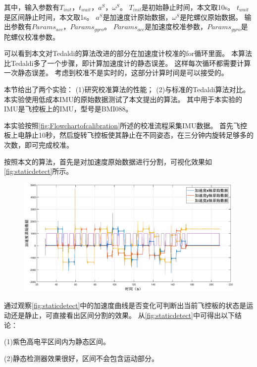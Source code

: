 \documentclass[
  type=master
]{gdutthesis}
\begin{document}
其中，输入参数有$T_{init}$，$t_{wait}$，$a^S$，$\omega^S$。
$T_{init}$是初始静止时间，本文取10s。
$t_{wait}$是区间静止时间，本文取1s。
$a^S$是加速度计原始数据，$\omega^S$是陀螺仪原始数据。
输出参数有$Params_{acc}$，$Params_{gyro}$。
$Params_{acc}$是加速度校准参数，$Params_{gyro}$是陀螺仪校准参数。

可以看到本文对Tedaldi的算法改进的部分在加速度计校准的for循环里面。
本算法比Tedaldi多了一个步骤，即计算加速度计的静态误差。
这样每次循环都需要计算一次静态误差。
考虑到校准不是实时的，这部分计算时间是可以接受的。

本节给出了两个实验：
(1)研究校准算法的性能；
(2)与标准的Tedaldi算法对比。
本实验使用低成本IMU的原始数据测试了本文提出的算法。
其中用于本实验的IMU是飞控板上的IMU，型号是BMI088。

本实验按照\autoref{fig:Flowchartofcalibration}所述的校准流程采集IMU数据。
首先飞控板上电静止10秒，然后旋转飞控板使其静止在不同姿态，在三分钟内旋转足够多的次数，即可完成校准。

按照本文的算法，首先是对加速度原始数据进行分割，可视化效果如\autoref{fig:staticdetect}所示。
\begin{figure}[H]
	\centering
	\includegraphics[width=1.0\textwidth]{staticdetect3.eps}
	\label{fig:staticdetect}
\end{figure}
通过观察\autoref{fig:staticdetect}中的加速度曲线是否变化可判断出当前飞控板的状态是运动还是静止，可直接看出区间分割的效果。
从\autoref{fig:staticdetect}中可得出以下结论：

(1)紫色高电平区间内为静态区间。

(2)静态检测器效果很好，区间不会包含运动部分。
\end{document}
